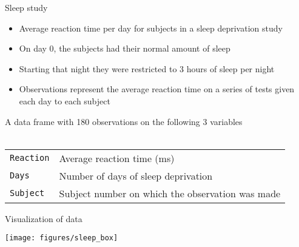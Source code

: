 \documentclass[aspectratio=169]{beamer}
\begin{document}
\begin{frame}{Sleep study}
  \begin{itemize}
    \item Average reaction time per day for subjects in a sleep deprivation
      study
    \item On day 0, the subjects had their normal amount of sleep
    \item Starting that night they were restricted to 3 hours of sleep per
      night
    \item Observations represent the average reaction time on a series of
      tests given each day to each subject
  \end{itemize}

  \vfill
  A data frame with 180 observations on the following 3 variables\\~\\

  \begin{tabular}{ll}
    \hline
     \texttt{Reaction} & Average reaction time (ms) \\
     \texttt{Days} & Number of days of sleep deprivation \\
     \texttt{Subject} & Subject number on which the observation was made \\
     \hline
  \end{tabular}
\end{frame}


\begin{frame}{Visualization of data}
  \begin{center}
      \texttt{[image: figures/sleep\_box]}
  \end{center}
\end{frame}
\end{document}
